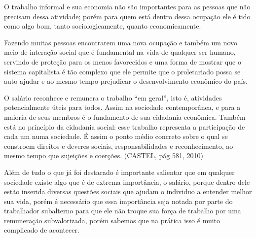 O trabalho informal e sua economia não são importantes para as pessoas que não precisam dessa atividade; porém para quem está dentro dessa ocupação ele é tido como algo bom, tanto sociologicamente, quanto economicamente. 

Fazendo muitas pessoas encontrarem uma nova ocupação e também um novo meio de interação social que é fundamental na vida de qualquer ser humano, servindo de proteção para os menos favorecidos e uma forma de mostrar que o sistema capitalista é tão complexo que ele permite que o proletariado possa se auto-ajudar e ao mesmo tempo prejudicar o desenvolvimento econômico do país.

\begin{citacao}
O salário reconhece e remunera o trabalho ``em geral'', isto é, atividades potencialmente úteis para todos. Assim na sociedade contemporânea, e para a maioria de seus membros é o fundamento de sua cidadania econômica. Também está no princípio da cidadania social: esse trabalho representa a participação de cada um numa sociedade. É assim o ponto médio concreto sobre o qual se constroem direitos e deveres sociais, responsabilidades e reconhecimento, ao mesmo tempo que sujeições e coerções. (CASTEL, pág 581, 2010)
\end{citacao}

Além de tudo o que já foi destacado é importante salientar que em qualquer sociedade existe algo que é de extrema importância, o salário, porque dentro dele estão inserida diversas questões sociais que ajudam o individuo a entender melhor sua vida, porém é necessário que essa importância seja notada por parte do trabalhador subalterno para que ele não troque sua força de trabalho por uma remuneração subvalorizada, porém sabemos que na prática isso é muito complicado de acontecer.
